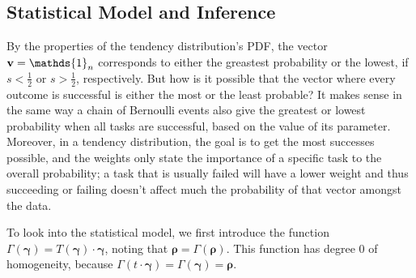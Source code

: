 \documentclass{article}
\newcommand{\0}{\mathbbold{0}}
\newcommand{\1}{\mathds{1}}
\newcommand{\2}{\mathbbold{2}}
\begin{document}
\subsection{Statistical Model and Inference}
By the properties of the tendency distribution's PDF, the vector ${\bf v} = \1_n$ corresponds to either the greastest probability or the lowest, if $s < \frac{1}{2}$ or $s > \frac{1}{2}$, respectively.
But how is it possible that the vector where every outcome is successful is either the most or the least probable? It makes sense in the same way a chain of Bernoulli events also give the greatest or lowest probability when all tasks are successful, based on the value of its parameter.
Moreover, in a tendency distribution, the goal is to get the most successes possible, and the weights only state the importance of a specific task to the overall probability; a task that is usually failed will have a lower weight and thus succeeding or failing doesn't affect much the probability of that vector amongst the data.

To look into the statistical model, we first introduce the function $\varGamma({\boldsymbol \gamma}) = T({\boldsymbol \gamma})\cdot {\boldsymbol \gamma}$, noting that ${\boldsymbol \rho} = \varGamma({\boldsymbol \rho})$. This function has degree 0 of homogeneity, because $\varGamma( t \cdot{\boldsymbol \gamma}) = \varGamma({\boldsymbol \gamma}) = {\boldsymbol \rho}$.
\end{document}
